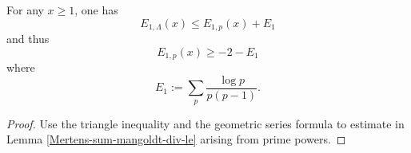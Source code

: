 \begin{corollary}
\label{Mertens-first-error-prime-ge}
\leanok
For any $x \geq 1$, one has
$$ E_{1,\Lambda}(x) \leq E_{1,p}(x) + E_1$$
and thus
$$ E_{1,p}(x) \geq -2 - E_1$$
where
$$ E_1 := \sum_{p} \frac{\log p}{p(p-1)}. $$
\end{corollary}
\begin{proof}
\leanok
Use the triangle inequality and the geometric series formula to estimate in Lemma \ref{Mertens-sum-mangoldt-div-le} arising from prime powers.
\end{proof}

